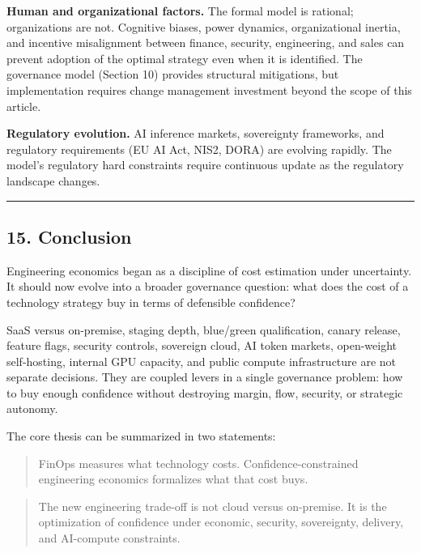 \documentclass[
]{article}
\begin{document}
\textbf{Human and organizational factors.} The formal model is rational;
organizations are not. Cognitive biases, power dynamics, organizational
inertia, and incentive misalignment between finance, security,
engineering, and sales can prevent adoption of the optimal strategy even
when it is identified. The governance model (Section 10) provides
structural mitigations, but implementation requires change management
investment beyond the scope of this article.

\textbf{Regulatory evolution.} AI inference markets, sovereignty
frameworks, and regulatory requirements (EU AI Act, NIS2, DORA) are
evolving rapidly. The model's regulatory hard constraints require
continuous update as the regulatory landscape changes.

\begin{center}\rule{0.5\linewidth}{0.5pt}\end{center}

\subsection{15. Conclusion}\label{conclusion}

Engineering economics began as a discipline of cost estimation under
uncertainty. It should now evolve into a broader governance question:
what does the cost of a technology strategy buy in terms of defensible
confidence?

SaaS versus on-premise, staging depth, blue/green qualification, canary
release, feature flags, security controls, sovereign cloud, AI token
markets, open-weight self-hosting, internal GPU capacity, and public
compute infrastructure are not separate decisions. They are coupled
levers in a single governance problem: how to buy enough confidence
without destroying margin, flow, security, or strategic autonomy.

The core thesis can be summarized in two statements:

\begin{quote}
FinOps measures what technology costs. Confidence-constrained
engineering economics formalizes what that cost buys.
\end{quote}

\begin{quote}
The new engineering trade-off is not cloud versus on-premise. It is the
optimization of confidence under economic, security, sovereignty,
delivery, and AI-compute constraints.
\end{quote}
\end{document}
